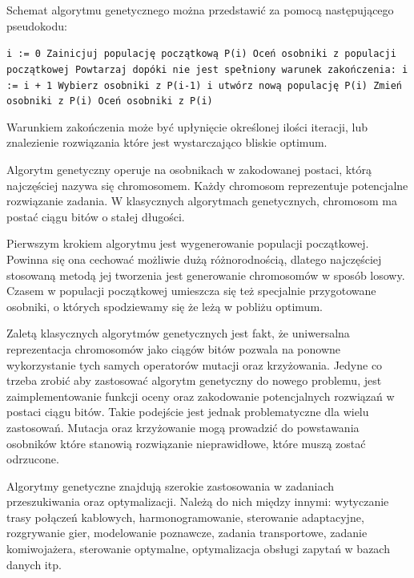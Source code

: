\documentclass[brudnopis]{xmgr}
\begin{document}
Schemat algorytmu genetycznego można przedstawić za pomocą następującego pseudokodu:

\noindent
\texttt{i := 0\newline
Zainicjuj populację początkową P(i)\newline
Oceń osobniki z populacji początkowej\newline
Powtarzaj dopóki nie jest spełniony warunek zakończenia:\newline
\indent i := i + 1\newline
\indent Wybierz osobniki z P(i-1) i utwórz nową populację P(i)\newline
\indent Zmień osobniki z P(i)\newline
\indent Oceń osobniki z P(i)\newline
}

Warunkiem zakończenia może być upłynięcie określonej ilości iteracji, lub znalezienie rozwiązania które jest wystarczająco bliskie optimum.

Algorytm genetyczny operuje na osobnikach w zakodowanej postaci, którą najczęściej nazywa się chromosomem. Każdy chromosom reprezentuje potencjalne rozwiązanie zadania. W klasycznych algorytmach genetycznych, chromosom ma postać ciągu bitów o stałej długości.

Pierwszym krokiem algorytmu jest wygenerowanie populacji początkowej. Powinna się ona cechować możliwie dużą różnorodnością, dlatego najczęściej stosowaną metodą jej tworzenia jest generowanie chromosomów w sposób losowy. Czasem w populacji początkowej umieszcza się też specjalnie przygotowane osobniki, o których spodziewamy się że leżą w pobliżu optimum.

Zaletą klasycznych algorytmów genetycznych jest fakt, że uniwersalna reprezentacja chromosomów jako ciągów bitów pozwala na ponowne wykorzystanie tych samych operatorów mutacji oraz krzyżowania. Jedyne co trzeba zrobić aby zastosować algorytm genetyczny do nowego problemu, jest zaimplementowanie funkcji oceny oraz zakodowanie potencjalnych rozwiązań w postaci ciągu bitów. Takie podejście jest jednak problematyczne dla wielu zastosowań. Mutacja oraz krzyżowanie mogą prowadzić do powstawania osobników które stanowią rozwiązanie nieprawidłowe, które muszą zostać odrzucone.

Algorytmy genetyczne znajdują szerokie zastosowania w zadaniach przeszukiwania oraz optymalizacji. Należą do nich między innymi: wytyczanie trasy połączeń kablowych, harmonogramowanie, sterowanie adaptacyjne, rozgrywanie gier, modelowanie poznawcze, zadania transportowe, zadanie komiwojażera, sterowanie optymalne, optymalizacja obsługi zapytań w bazach danych itp.\cite{Michalewicz:2003:AGSDPE}
\end{document}
